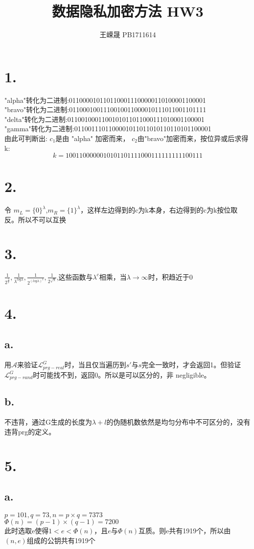 \documentclass{article}
\title{数据隐私加密方法 HW3}
\author{王嵘晟 \quad PB1711614}
\date{}
\begin{document}
	\maketitle
	\section*{1.}
	"alpha"转化为二进制:0110000101101100011100000110100001100001\\
	"bravo"转化为二进制:0110001001110010011000010111011001101111\\
	"delta"转化为二进制:0110010001100101011011000111010001100001\\
	"gamma"转化为二进制:0110011101100001011011010110110101100001\\
	由此可判断出: $c_{1}$是由 "alpha" 加密而来， $c_{2}$由"bravo"加密而来，按位异或后求得k:
	$$k=1001100000010101101111000111111111100111‬$$
	\section*{2.}
	令 $m_{L}=\{0\}^{\lambda}$,$m_{R}=\{1\}^{\lambda}$，这样左边得到的c为k本身，右边得到的c为k按位取反。所以不可以互换
	\section*{3.}
	$\frac{1}{2^{\frac{\lambda}{2}}},\frac{1}{\lambda^{log\lambda}},\frac{1}{2^{(log\lambda)^2}},\frac{1}{2^{\sqrt{\lambda}}}$,这些函数与$\lambda^{c}$相乘，当$\lambda \rightarrow \infty$时，积趋近于0
	\section*{4.}
	\subsection*{a.}
	用$\mathcal{A}$来验证$\mathcal{L}_{prg-real}^{G}$时，当且仅当遍历到$s'$与$s$完全一致时，才会返回1。但验证$\mathcal{L}_{prg-rand}^{G}$时可能找不到，返回0。所以是可以区分的，非 negligible。
	\subsection*{b.}
	不违背，通过G生成的长度为$\lambda+l$的伪随机数依然是均匀分布中不可区分的，没有违背prg的定义。
	\section*{5.}
	\subsection*{a.}
	$p=101,q=73,n=p\times q=7373$\\
	$\Phi(n)=(p-1)\times(q-1)=7200$\\
	此时选取e使得$1<e<\Phi(n)$，且$e$与$\Phi(n)$互质。则e共有1919个，所以由$(n,e)$组成的公钥共有1919个
\end{document}
